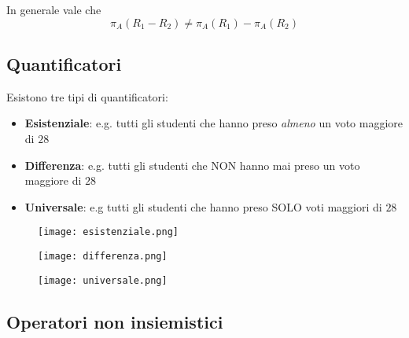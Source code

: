 \begin{observation}
	In generale vale che
	\begin{equation}
		\pi_A(R_1 - R_2) \neq \pi_A (R_1)-\pi_A(R_2)
	\end{equation}
\end{observation}

\newpage
\subsection{Quantificatori}
Esistono tre tipi di quantificatori:
\begin{itemize}
	\item \textbf{Esistenziale}: e.g. tutti gli studenti che hanno preso \textit{almeno} un voto maggiore di $28$
	\item \textbf{Differenza}: e.g. tutti gli studenti che NON hanno mai preso un voto maggiore di $28$
	\item \textbf{Universale}: e.g tutti gli studenti che hanno preso SOLO voti maggiori di $28$
\end{itemize}
\begin{figure}[!h]
	\centering
	\begin{minipage}{.3\textwidth}
		\centering
		\texttt{[image: esistenziale.png]}
	\end{minipage}
	\begin{minipage}{.3\textwidth}
		\centering
		\texttt{[image: differenza.png]}
	\end{minipage}
	\begin{minipage}{.3\textwidth}
	\centering
	\texttt{[image: universale.png]}
	\end{minipage}
\end{figure}

\subsection{Operatori non insiemistici}

